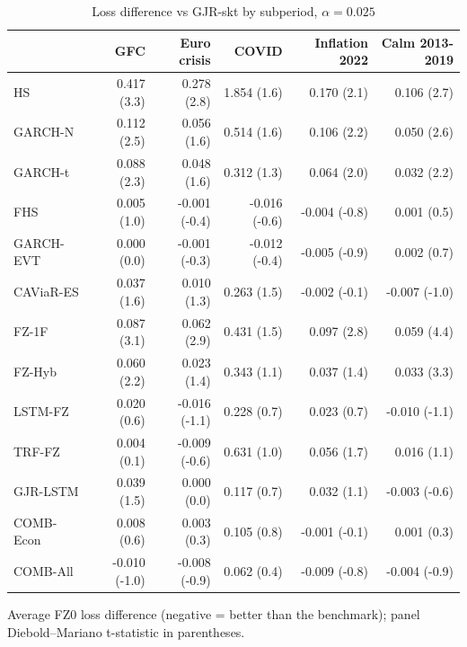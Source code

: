 \begin{table}[htbp]
\centering
\footnotesize
\caption{Loss difference vs GJR-skt by subperiod, $\alpha=0.025$}
\label{tab:sub}
\begin{tabular}{lrrrrr}
\toprule
 & GFC & Euro crisis & COVID & Inflation 2022 & Calm 2013-2019 \\
\midrule
HS & 0.417 (3.3) & 0.278 (2.8) & 1.854 (1.6) & 0.170 (2.1) & 0.106 (2.7) \\
GARCH-N & 0.112 (2.5) & 0.056 (1.6) & 0.514 (1.6) & 0.106 (2.2) & 0.050 (2.6) \\
GARCH-t & 0.088 (2.3) & 0.048 (1.6) & 0.312 (1.3) & 0.064 (2.0) & 0.032 (2.2) \\
FHS & 0.005 (1.0) & -0.001 (-0.4) & -0.016 (-0.6) & -0.004 (-0.8) & 0.001 (0.5) \\
GARCH-EVT & 0.000 (0.0) & -0.001 (-0.3) & -0.012 (-0.4) & -0.005 (-0.9) & 0.002 (0.7) \\
CAViaR-ES & 0.037 (1.6) & 0.010 (1.3) & 0.263 (1.5) & -0.002 (-0.1) & -0.007 (-1.0) \\
FZ-1F & 0.087 (3.1) & 0.062 (2.9) & 0.431 (1.5) & 0.097 (2.8) & 0.059 (4.4) \\
FZ-Hyb & 0.060 (2.2) & 0.023 (1.4) & 0.343 (1.1) & 0.037 (1.4) & 0.033 (3.3) \\
LSTM-FZ & 0.020 (0.6) & -0.016 (-1.1) & 0.228 (0.7) & 0.023 (0.7) & -0.010 (-1.1) \\
TRF-FZ & 0.004 (0.1) & -0.009 (-0.6) & 0.631 (1.0) & 0.056 (1.7) & 0.016 (1.1) \\
GJR-LSTM & 0.039 (1.5) & 0.000 (0.0) & 0.117 (0.7) & 0.032 (1.1) & -0.003 (-0.6) \\
COMB-Econ & 0.008 (0.6) & 0.003 (0.3) & 0.105 (0.8) & -0.001 (-0.1) & 0.001 (0.3) \\
COMB-All & -0.010 (-1.0) & -0.008 (-0.9) & 0.062 (0.4) & -0.009 (-0.8) & -0.004 (-0.9) \\
\bottomrule
\end{tabular}
\par\smallskip\parbox{\linewidth}{\scriptsize Average FZ0 loss difference (negative = better than the benchmark); panel Diebold--Mariano t-statistic in parentheses.}
\end{table}